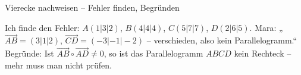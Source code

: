 \begin{aufgabe}{Vierecke nachweisen – Fehler finden, Begründen}
\begin{teile}
\teil Ich finde den Fehler: $A(1 | 3 | 2)$, $B(4 | 4 | 4)$, $C(5 | 7 | 7)$, $D(2 | 6 | 5)$. Mara: „$\overrightarrow{AB} = (3 | 1 | 2)$, $\overrightarrow{CD} = (-3 | -1 | -2)$ – verschieden, also kein Parallelogramm.“
\teil Begründe: Ist $\overrightarrow{AB} \circ \overrightarrow{AD} \ne 0$, so ist das Parallelogramm $ABCD$ kein Rechteck – mehr muss man nicht prüfen.
\end{teile}
\end{aufgabe}

